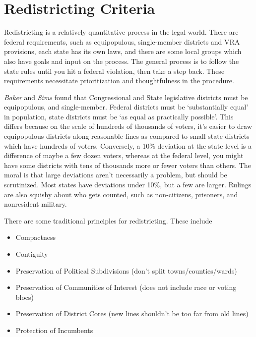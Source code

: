 



\section*{Redistricting Criteria}

Redistricting is a relatively quantitative process in the legal world.  There are federal requirements, such as equipopulous, single-member districts and VRA provisions, each state has its own laws, and there are some local groups which also have goals and input on the process.  The general process is to follow the state rules until you hit a federal violation, then take a step back.  These requirements necessitate prioritization and thoughtfulness in the procedure.

\textit{Baker} and \textit{Sims} found that Congressional and State legislative districts must be equipopulous, and single-member.  Federal districts must be `substantially equal' in population, state districts must be `as equal as practically possible'.  This differs because on the scale of hundreds of thousands of voters, it's easier to draw equipopulous districts along reasonable lines as compared to small state districts which have hundreds of voters.  Conversely, a 10\% deviation at the state level is a difference of maybe a few dozen voters, whereas at the federal level, you might have some districts with tens of thousands more or fewer voters than others.  The moral is that large deviations aren't necessarily a problem, but should be scrutinized.  Most states have deviations under 10\%, but a few are larger. Rulings are also squishy about who gets counted, such as non-citizens, prisoners, and nonresident military.

There are some traditional principles for redistricting.  These include

\begin{itemize}
	\item[] Compactness
	\item[] Contiguity
	\item[] Preservation of Political Subdivisions (don't split towns/counties/wards)
	\item[] Preservation of Communities of Interest (does not include race or voting blocs)
	\item[] Preservation of District Cores (new lines shouldn't be too far from old lines)
	\item[] Protection of Incumbents
\end{itemize}

